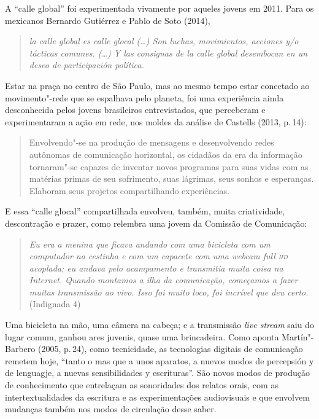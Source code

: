 A ``calle global'' foi experimentada vivamente por aqueles jovens em
2011. Para os mexicanos Bernardo Gutiérrez e Pablo de Soto (2014),

\begin{quote}
\emph{la calle global es calle glocal (\ldots{}) Son luchas, movimientos,
acciones y/o tácticas comunes. (\ldots{}) Y las consignas de la calle global
desembocan en un deseo de participación política. }
\end{quote}

Estar na praça no centro de São Paulo, mas ao mesmo tempo estar
conectado ao movimento"-rede que se espalhava pelo planeta, foi uma
experiência ainda desconhecida pelos jovens brasileiros
entrevistados, que perceberam e experimentaram a ação em rede, nos
moldes da análise de Castells (2013, p.\,14):

\begin{quote}
Envolvendo"-se na produção de mensagens e desenvolvendo redes autônomas
de comunicação horizontal, os cidadãos da era da informação tornaram"-se
capazes de inventar novos programas para suas vidas com as matérias
primas de seu sofrimento, suas lágrimas, seus sonhos e esperanças.
Elaboram seus projetos compartilhando experiências.
\end{quote}

E essa ``calle glocal'' compartilhada envolveu, também, muita
criatividade, descontração e prazer, como relembra uma jovem da Comissão
de Comunicação:

\begin{quote}
\emph{Eu era a menina que ficava andando com uma bicicleta com um
computador na cestinha e com um capacete com uma webcam full \textsc{hd}
acoplada; eu andava pelo acampamento e transmitia muita coisa na
Internet. Quando montamos a ilha da comunicação, começamos a fazer
muitas transmissão ao vivo. Isso foi muito loco, foi incrível que deu
certo.} (Indignada 4)
\end{quote}

Uma bicicleta na mão, uma câmera na cabeça; e a transmissão \emph{live
stream} saiu do lugar comum, ganhou ares juvenis, quase uma brincadeira.
Como aponta Martín"-Barbero (2005, p.\,24), como tecnicidade, as
tecnologias digitais de comunicação remetem hoje, ``tanto o mas que a
unos aparatos, a nuevos modos de percepsión y de lenguagje, a nuevas
sensibilidades y escrituras''. São novos modos de produção de
conhecimento que entrelaçam as sonoridades dos relatos orais, com as
intertextualidades da escritura e as experimentações audiovisuais e que
envolvem mudanças também nos modos de circulação desse saber.

